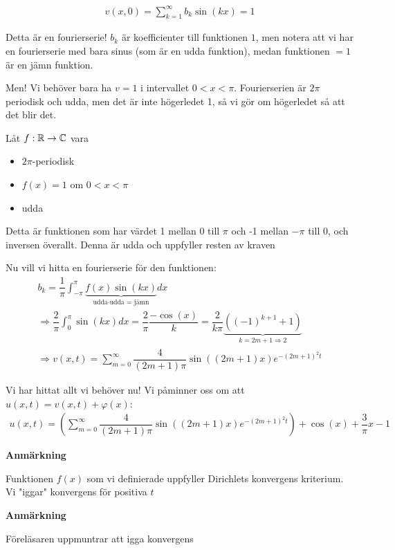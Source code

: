 \begin{equation*}
  \begin{gathered}
    v(x,0) = \sum_{k=1}^{\infty}b_k\sin(kx) = 1
  \end{gathered}
\end{equation*}\par
\noindent Detta är en fourierserie! $b_k$ är koefficienter till funktionen $1$, men notera att vi har en fourierserie med bara sinus (som är en udda funktion), medan funktionen $=1$ är en jämn funktion.\par
\noindent Men! Vi behöver bara ha $v = 1$ i intervallet $0<x<\pi$. Fourierserien är $2\pi$ periodisk och udda, men det är inte högerledet 1, så vi gör om högerledet så att det blir det.
\par\bigskip
\noindent Låt $f:\mathbb{R}\to\mathbb{C}$ vara\par
\begin{itemize}
  \item $2\pi$-periodisk
  \item $f(x) = 1$ om $0<x<\pi$
  \item udda
\end{itemize}\par
\noindent Detta är funktionen som har värdet 1 mellan 0 till $\pi$ och -1 mellan $-\pi$ till 0, och inversen överallt. Denna är udda och uppfyller resten av kraven
\par\bigskip
\noindent Nu vill vi hitta en fourierserie för den funktionen:
\begin{equation*}
  \begin{gathered}
    b_k = \dfrac{1}{\pi}\int_{-\pi}^{\pi}\underbrace{f(x)\sin(kx)}_{\text{udda$\cdot$udda = jämn}}dx\\
    \Rightarrow \dfrac{2}{\pi}\int_{0}^{\pi}\sin(kx)dx = \dfrac{2}{\pi}\dfrac{-\cos(x)}{k} = \dfrac{2}{k\pi}\underbrace{\left((-1)^{k+1}+1\right)}_{\text{$k = 2m+1\Rightarrow 2$}}\\
    \Rightarrow v(x,t) = \sum_{m=0}^{\infty}\dfrac{4}{(2m+1)\pi}\sin\left((2m+1)x\right)e^{-(2m+1)^2t}
  \end{gathered}
\end{equation*}
\par\bigskip
\noindent Vi har hittat allt vi behöver nu! Vi påminner oss om att $u(x,t) = v(x,t)+\varphi(x)$:
\begin{equation*}
  \begin{gathered}
    u(x,t) = \left(\sum_{m=0}^{\infty}\dfrac{4}{(2m+1)\pi}\sin((2m+1)x)e^{-(2m+1)^2t}\right) + \cos(x)+\dfrac{3}{\pi}x-1
  \end{gathered}
\end{equation*}
\par\bigskip
\noindent\textbf{Anmärkning}\par
\noindent Funktionen $f(x)$ som vi definierade uppfyller Dirichlets konvergens kriterium. Vi "iggar" konvergens för positiva $t$
\par\bigskip
\noindent\textbf{Anmärkning}\par
\noindent Föreläsaren uppmuntrar att igga konvergens
